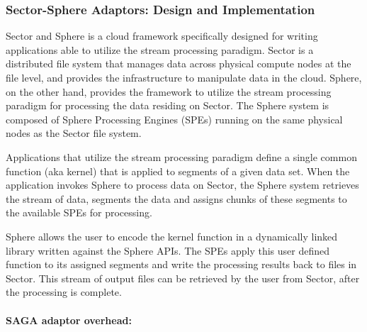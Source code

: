 \documentclass[3p,twocolumn]{elsarticle}
\begin{document}


\subsubsection{Sector-Sphere Adaptors: Design and Implementation}

Sector and Sphere is a cloud framework specifically designed for
writing applications able to utilize the stream processing paradigm.
Sector is a distributed file system that manages data across physical
compute nodes at the file level, and provides the infrastructure to
manipulate data in the cloud.  Sphere, on the other hand, provides the
framework to utilize the stream processing paradigm for processing the
data residing on Sector.  The Sphere system is composed of Sphere
Processing Engines (SPEs) running on the same physical nodes as the
Sector file system.

Applications that utilize the stream processing paradigm define a
single common function (aka kernel) that is applied to segments of a
given data set.  When the application invokes Sphere to process data
on Sector, the Sphere system retrieves the stream of data, segments
the data and assigns chunks of these segments to the available SPEs
for processing.

Sphere allows the user to encode the kernel function in a dynamically
linked library written against the Sphere APIs.  The SPEs apply this
user defined function to its assigned segments and write the
processing results back to files in Sector.  This stream of output
files can be retrieved by the user from Sector, after the processing
is complete. 


\paragraph{SAGA adaptor overhead:} \label{ssec:overhead}
\end{document}
